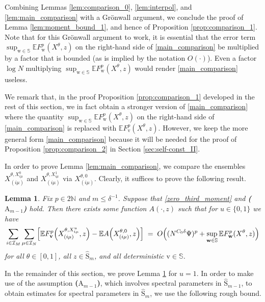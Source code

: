 \documentclass[11pt]{article} %
\numberwithin{equation}{section}
\numberwithin{figure}{section}
\theoremstyle{plain} %
\newtheorem{lemma}[theorem]{Lemma}
\theoremstyle{definition} %
\newcommand{\f}[1]{\boldsymbol{\mathrm{#1}}} %
\newcommand{\bb}{\mathbb} %
\renewcommand{\cal}{\mathcal}
\newcommand{\wh}{\widehat}
\newcommand{\E}{\mathbb{E}}
\newcommand{\N}{\mathbb{N}}
\renewcommand{\leq}{\leqslant}
\newcommand{\pB}[1]{\Bigl({#1}\Bigr)}
\newcommand{\qB}[1]{\Bigl[{#1}\Bigr]}
\begin{document}
Combining Lemmas \ref{lem:comparison_0}, \ref{lem:interpol}, and \ref{lem:main_comparison} with a Gr\"onwall argument, we conclude the proof of Lemma \ref{lem:moment_bound_1}, and hence of Proposition \ref{prop:comparison_1}. Note that for this Gr\"onwall argument to work, it is essential that the error term $\sup_{\f w \in \bb S} \E F_{\f w}^p(X^\theta, z)$ on the right-hand side of \eqref{main_comparison} be multiplied by a factor that is bounded (as is implied by the notation $O(\cdot)$). Even a factor $\log N$ multiplying $\sup_{\f w \in \bb S} \E F_{\f w}^p(X^\theta, z)$ would render \eqref{main_comparison} useless.

We remark that, in the proof Proposition \ref{prop:comparison_1} developed in the rest of this section, we in fact obtain a stronger version of \eqref{main_comparison} where the quantity $\sup_{\f w \in \bb S} \E F_{\f w}^p(X^\theta, z)$ on the right-hand side of \eqref{main_comparison} is replaced with $\E F_{\f v}^p(X^\theta, z)$. However, we keep the more general form \eqref{main_comparison} because it will be needed for the proof of Proposition \ref{prop:comparison_2} in Section \ref{sec:self-const_II}.

In order to prove Lemma \ref{lem:main_comparison}, we compare the ensembles $X^{\theta,X^0_{i \mu}}_{(i \mu)}$ and $X^{\theta,X^1_{i \mu}}_{(i \mu)}$ via $X^{\theta,0}_{(i \mu)}$. Clearly, it suffices to prove the following result.
\begin{lemma} \label{lem:main_comparison2}
Fix $p \in 2 \N$ and $m \leq \delta^{-1}$. Suppose that \eqref{zero_third_moment} and \textbf{($\f A_{m - 1}$)} hold.
Then there exists some function $A(\cdot, z)$ such that for $u \in \{0,1\}$ we have
\begin{equation} \label{main_comparison2}
\sum_{i \in \cal I_M} \sum_{\mu \in \cal I_N} \qB{ \E F_{\f v}^p \pB{X^{\theta,X^u_{i \mu}}_{(i \mu)}, z} - \E A \pB{X^{\theta,0}_{(i \mu)}, z}} \;=\; O \pB{(N^{C_0 \delta}\Psi)^p + \sup_{\f w \in \bb S} \E F_{\f w}^p(X^\theta, z)}
\end{equation}
for all $\theta \in [0,1]$, all $z \in \wh{\f S}_m$, and all deterministic $\f v \in \bb S$.
\end{lemma}

In the remainder of this section, we prove Lemma \ref{lem:main_comparison2} for $u = 1$. In order to make use of the assumption \textbf{($\f A_{m - 1}$)}, which involves spectral parameters in $\wh {\f S}_{m - 1}$, to obtain estimates for spectral parameters in $\wh {\f S}_m$, we use the following rough bound.
\end{document}
